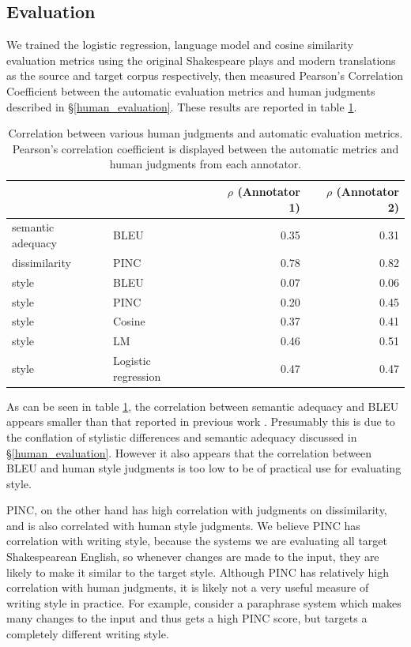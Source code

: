 \documentclass[10pt,a5paper,twoside]{article}
\begin{document}
\subsection{Evaluation}
We trained the logistic regression, language model and cosine similarity evaluation metrics using the original Shakespeare plays and modern translations as
the source and target corpus respectively, then measured Pearson's Correlation Coefficient between the automatic
evaluation metrics and human judgments described in \S \ref{human_evaluation}.  These results are reported in table \ref{correlation}.

\begin{table}
  \begin{center}
  \begin{tabular}{|l|l|r|r|}
    \hline
    & & $\rho$ (Annotator 1) & $\rho$ (Annotator 2) \\
    \hline
    \hline
    semantic adequacy & BLEU & 0.35 & 0.31 \\
    \hline
    dissimilarity & PINC & 0.78 & 0.82 \\
    \hline
    style & BLEU & 0.07 & 0.06 \\
    \hline
    style & PINC & 0.20 & 0.45 \\
    \hline
    style & Cosine & 0.37 & 0.41 \\
    \hline
    style & LM & 0.46 & 0.51 \\
    \hline
    style & Logistic regression & 0.47 & 0.47 \\
    \hline
  \end{tabular}
  \end{center}
  \caption{Correlation between various human judgments and automatic evaluation metrics.  Pearson's correlation coefficient is displayed
  between the automatic metrics and human judgments from each annotator.}
  \label{correlation}
\end{table}

As can be seen in table \ref{correlation}, the correlation between semantic adequacy and BLEU appears smaller than that reported in previous work \cite{chen11}.  Presumably this is
due to the conflation of stylistic differences and semantic adequacy discussed in \S \ref{human_evaluation}.  However it also appears 
that the correlation between BLEU and human style judgments is too low to be of practical use for evaluating style.

PINC, on the other hand has high correlation with judgments on dissimilarity, and is also correlated with human style
judgments.  We believe PINC has correlation with writing style, because the systems we are evaluating all target Shakespearean English, 
so whenever changes are made to the input, they are likely to make it similar to the target style.
Although PINC has relatively high correlation with human judgments, it is likely not a very useful measure of writing style in practice.
For example, consider a paraphrase system which makes many changes to the input and thus gets a high PINC score, but targets a completely different writing style.
\end{document}
